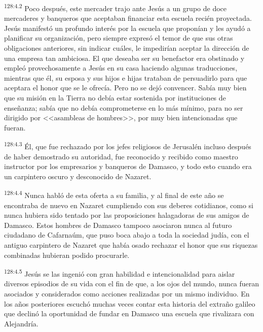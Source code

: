 \par 
\textsuperscript{128:4.2} Poco después, este mercader trajo ante Jesús a un grupo de doce mercaderes y banqueros que aceptaban financiar esta escuela recién proyectada. Jesús manifestó un profundo interés por la escuela que proponían y les ayudó a planificar su organización, pero siempre expresó el temor de que sus otras obligaciones anteriores, sin indicar cuáles, le impedirían aceptar la dirección de una empresa tan ambiciosa. El que deseaba ser su benefactor era obstinado y empleó provechosamente a Jesús en su casa haciendo algunas traducciones, mientras que él, su esposa y sus hijos e hijas trataban de persuadirlo para que aceptara el honor que se le ofrecía. Pero no se dejó convencer. Sabía muy bien que su misión en la Tierra no debía estar sostenida por instituciones de enseñanza; sabía que no debía comprometerse en lo más mínimo, para no ser dirigido por <<asambleas de hombres>>, por muy bien intencionadas que fueran.

\par 
\textsuperscript{128:4.3} Él, que fue rechazado por los jefes religiosos de Jerusalén incluso después de haber demostrado su autoridad, fue reconocido y recibido como maestro instructor por los empresarios y banqueros de Damasco, y todo esto cuando era un carpintero oscuro y desconocido de Nazaret.

\par 
\textsuperscript{128:4.4} Nunca habló de esta oferta a su familia, y al final de este año se encontraba de nuevo en Nazaret cumpliendo con sus deberes cotidianos, como si nunca hubiera sido tentado por las proposiciones halagadoras de sus amigos de Damasco. Estos hombres de Damasco tampoco asociaron nunca al futuro ciudadano de Cafarnaúm, que puso boca abajo a toda la sociedad judía, con el antiguo carpintero de Nazaret que había osado rechazar el honor que sus riquezas combinadas hubieran podido procurarle.

\par 
\textsuperscript{128:4.5} Jesús se las ingenió con gran habilidad e intencionalidad para aislar diversos episodios de su vida con el fin de que, a los ojos del mundo, nunca fueran asociados y considerados como acciones realizadas por un mismo individuo. En los años posteriores escuchó muchas veces contar esta historia del extraño galileo que declinó la oportunidad de fundar en Damasco una escuela que rivalizara con Alejandría.


